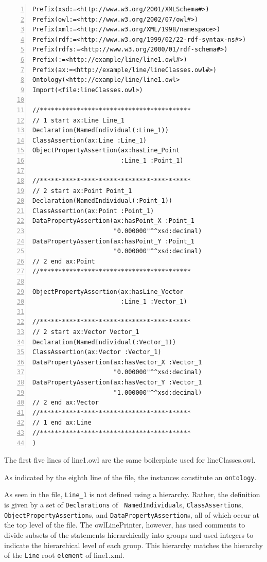 \documentclass[preprint,12pt]{elsarticle}
\newenvironment{mylisting}
{\begin{list}{}{\setlength{\leftmargin}{1em}}\item\small}
{\end{list}}
\begin{document}
\begin{mylisting}
\begin{Verbatim}[commandchars=\\\{\},numbers=left, numbersep=1pt]
Prefix(xsd:=<http://www.w3.org/2001/XMLSchema#>)
Prefix(owl:=<http://www.w3.org/2002/07/owl#>)
Prefix(xml:=<http://www.w3.org/XML/1998/namespace>)
Prefix(rdf:=<http://www.w3.org/1999/02/22-rdf-syntax-ns#>)
Prefix(rdfs:=<http://www.w3.org/2000/01/rdf-schema#>)
Prefix(:=<http://example/line/line1.owl#>)
Prefix(ax:=<http://example/line/lineClasses.owl#>)
Ontology(<http://example/line/line1.owl>
Import(<file:lineClasses.owl>)

//*****************************************
// 1 start ax:Line Line_1
Declaration(NamedIndividual(:Line_1))
ClassAssertion(ax:Line :Line_1)
ObjectPropertyAssertion(ax:hasLine_Point
                        :Line_1 :Point_1)

//*****************************************
// 2 start ax:Point Point_1
Declaration(NamedIndividual(:Point_1))
ClassAssertion(ax:Point :Point_1)
DataPropertyAssertion(ax:hasPoint_X :Point_1
                      "0.000000"^^xsd:decimal)
DataPropertyAssertion(ax:hasPoint_Y :Point_1
                      "0.000000"^^xsd:decimal)
// 2 end ax:Point
//*****************************************

ObjectPropertyAssertion(ax:hasLine_Vector
                        :Line_1 :Vector_1)

//*****************************************
// 2 start ax:Vector Vector_1
Declaration(NamedIndividual(:Vector_1))
ClassAssertion(ax:Vector :Vector_1)
DataPropertyAssertion(ax:hasVector_X :Vector_1
                      "0.000000"^^xsd:decimal)
DataPropertyAssertion(ax:hasVector_Y :Vector_1
                      "1.000000"^^xsd:decimal)
// 2 end ax:Vector
//*****************************************
// 1 end ax:Line
//*****************************************
)
\end{Verbatim}
\label{test5}
\end{mylisting}


The first five lines of line1.owl are the same boilerplate used for
lineClasses.owl.

As indicated by the eighth line of the file, the instances constitute an
{\tt ontology}.

As seen in the file, {\tt Line\_1} is not defined using a hierarchy.
Rather, the definition is given by a set of {\tt Declarations} of {\tt
  NamedIndividual}s, {\tt ClassAssertion}s, {\tt ObjectPropertyAssertion}s,
and {\tt DataPropertyAssertion}s, all of which occur at the top level of
the file. The owlLinePrinter, however, has used comments to divide subsets
of the statements hierarchically into groups and used integers to indicate
the hierarchical level of each group. This hierarchy matches the hierarchy
of the {\tt Line} root {\tt element} of line1.xml.
\end{document}
